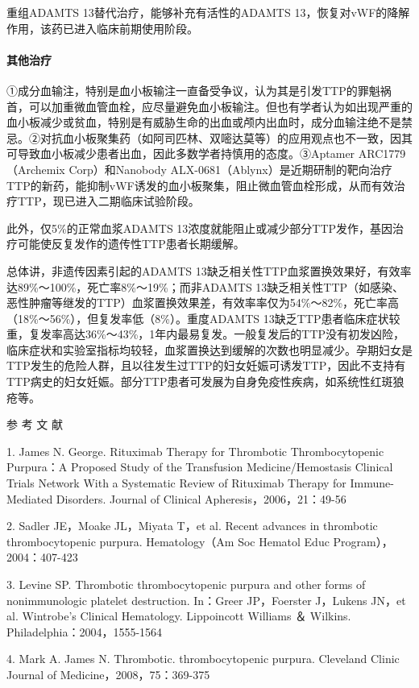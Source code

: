 重组ADAMTS 13替代治疗，能够补充有活性的ADAMTS
13，恢复对vWF的降解作用，该药已进入临床前期使用阶段。

\paragraph{其他治疗}

①成分血输注，特别是血小板输注一直备受争议，认为其是引发TTP的罪魁祸首，可以加重微血管血栓，应尽量避免血小板输注。但也有学者认为如出现严重的血小板减少或贫血，特别是有威胁生命的出血或颅内出血时，成分血输注绝不是禁忌。②对抗血小板聚集药（如阿司匹林、双嘧达莫等）的应用观点也不一致，因其可导致血小板减少患者出血，因此多数学者持慎用的态度。③Aptamer
ARC1779（Archemix Corp）和Nanobody
ALX-0681（Ablynx）是近期研制的靶向治疗TTP的新药，能抑制vWF诱发的血小板聚集，阻止微血管血栓形成，从而有效治疗TTP，现已进入二期临床试验阶段。

此外，仅5\%的正常血浆ADAMTS
13浓度就能阻止或减少部分TTP发作，基因治疗可能使反复发作的遗传性TTP患者长期缓解。

总体讲，非遗传因素引起的ADAMTS
13缺乏相关性TTP血浆置换效果好，有效率达89\%～100\%，死亡率8\%～19\%；而非ADAMTS
13缺乏相关性TTP（如感染、恶性肿瘤等继发的TTP）血浆置换效果差，有效率率仅为54\%～82\%，死亡率高（18\%～56\%），但复发率低（8\%）。重度ADAMTS
13缺乏TTP患者临床症状较重，复发率高达36\%～43\%，1年内最易复发。一般复发后的TTP没有初发凶险，临床症状和实验室指标均较轻，血浆置换达到缓解的次数也明显减少。孕期妇女是TTP发生的危险人群，且以往发生过TTP的妇女妊娠可诱发TTP，因此不支持有TTP病史的妇女妊娠。部分TTP患者可发展为自身免疫性疾病，如系统性红斑狼疮等。

\hypertarget{text00334.htmlux5cux23CHP12-1-4-4}{}
参 考 文 献

1. James N. George. Rituximab Therapy for Thrombotic Thrombocytopenic
Purpura：A Proposed Study of the Transfusion Medicine/Hemostasis
Clinical Trials Network With a Systematic Review of Rituximab Therapy
for Immune-Mediated Disorders. Journal of Clinical
Apheresis，2006，21：49-56

2. Sadler JE，Moake JL，Miyata T，et al. Recent advances in thrombotic
thrombocytopenic purpura. Hematology（Am Soc Hematol Educ
Program），2004：407-423

3. Levine SP. Thrombotic thrombocytopenic purpura and other forms of
nonimmunologic platelet destruction. In：Greer JP，Foerster J，Lukens
JN，et al. Wintrobe's Clinical Hematology. Lippoincott Williams ＆
Wilkins. Philadelphia：2004，1555-1564

4. Mark A. James N. Thrombotic. thrombocytopenic purpura. Cleveland
Clinic Journal of Medicine，2008，75：369-375

